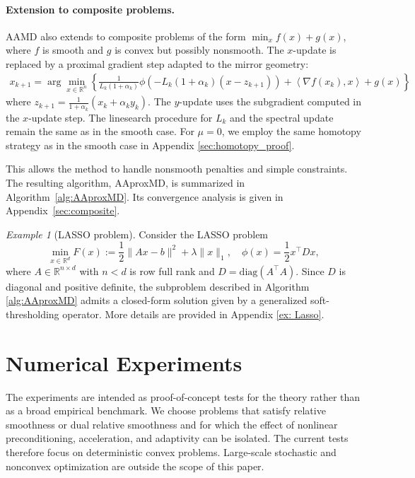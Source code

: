 \documentclass{article}
\newcommand{\LC}[1]{\textcolor{red}{#1}}
\newcommand{\dual}[1]{\left\langle {#1} \right\rangle}
\theoremstyle{plain}
\theoremstyle{definition}
\theoremstyle{remark}
\newtheorem{example}[theorem]{Example}
\begin{document}
\paragraph{Extension to composite problems.}
AAMD also extends to composite problems of the form $\min_x f(x)+g(x)$, where $f$ is smooth and $g$ is convex but possibly nonsmooth. The $x$-update is replaced by a proximal gradient step adapted to the mirror geometry:
\begin{equation}\label{eq:compositeproxsubproblem}
  \begin{aligned}
x_{k+1} = \arg\min_{x\in\mathbb{R}^n} \left \{\frac{1}{L_k(1+\alpha_k)}\phi\left(-L_k(1+\alpha_k)\left(x-z_{k+1}\right)\right)+\dual{\nabla f(x_{k}),x}+g(x)\right \}
  \end{aligned}
\end{equation}
where $z_{k+1} = \frac{1}{1+\alpha_k}(x_k+\alpha_k y_k)$. The $y$-update uses the subgradient computed in the $x$-update step. The linesearch procedure for $L_k$ and the spectral update remain the same as in the smooth case. For $\mu=0$, we employ the same homotopy strategy as in the smooth case in Appendix \ref{sec:homotopy_proof}.

This allows the method to handle nonsmooth penalties and simple constraints. The resulting algorithm, AAproxMD, is summarized in Algorithm~\ref{alg:AAproxMD}. Its convergence analysis is given in Appendix~\ref{sec:composite}.

\begin{example}[LASSO problem]%
Consider the LASSO problem
\begin{equation}%
    \min_{x \in \mathbb{R}^d} F(x) := \frac{1}{2} \|Ax - b\|^2 + \lambda \|x\|_1, \quad \phi(x)=\frac{1}{2} x^\top D x,
\end{equation}
where $A \in \mathbb{R}^{n \times d}$ with $n<d$ is row full rank and $D=\mathrm{diag}(A^\top A)$. Since $D$ is diagonal and positive definite, the subproblem described in Algorithm \ref{alg:AAproxMD} admits a closed-form solution given by a generalized soft-thresholding operator. More details are provided in Appendix \ref{ex: Lasso}.
\end{example}

\section{Numerical Experiments}

The experiments are intended as proof-of-concept tests for the theory rather
than as a broad empirical benchmark.  We choose problems that satisfy relative
smoothness or dual relative smoothness and for which the effect of nonlinear
preconditioning, acceleration, and adaptivity can be isolated.  The current
tests therefore focus on deterministic convex problems.  Large-scale stochastic
and nonconvex optimization are outside the scope of this paper.
\end{document}
